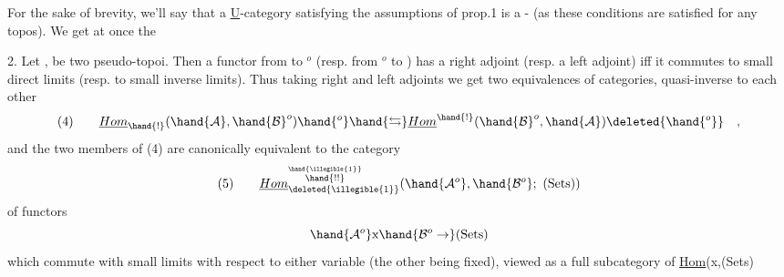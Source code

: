 
For the sake of brevity, we'll say that a \uline{U}-category satisfying the
assumptions of prop.1 is a \hand{\uline{\textcolor{black}{pseudo}}}-\hand{\uline{\textcolor{black}{topos}}} (as these conditions are satisfied
for any topos). We get at once the

\hand{\uline{\textcolor{black}{Corollary}}} 2. Let , be two pseudo-topoi. Then a functor from
 to $^{o}$ (resp. from $^{o}$ to  ) has a right adjoint (resp. a left
adjoint) iff it commutes to small direct limits (resp. to small inverse
limits). Thus taking right and left adjoints we get two equivalences of
categories, quasi-inverse to each other
\[ (4) \qquad \underline{Hom}_{\hand{!}}(\hand{\mathcal{A}},\hand{\mathcal{B}}^{o})\hand{{}^{o}}\hand{\leftrightarrows}\underline{Hom}^{\hand{!}}(\hand{\mathcal{B}}^{o},\hand{\mathcal{A}})\deleted{\hand{{}^{o}}} \quad , \]
and the two members of (4) are canonically equivalent to the  category
\[ (5) \qquad \underline{Hom}^{\overset{\hand{\illegible{1}}}{\hand{!!}}}_{\deleted{\illegible{1}}}(\hand{\mathcal{A}^{o}},\hand{\mathcal{B}^{o}};\text{ (Sets)}) \]
of functors
\[ \hand{\mathcal{A}^{o}}\text{x}\hand{\mathcal{B}^{o}\to}\text{(Sets)} \]
which commute with small  limits with respect to either variable
(the other being fixed),  viewed as a full subcategory of \uline{Hom}(x,(Sets\hand{)})

